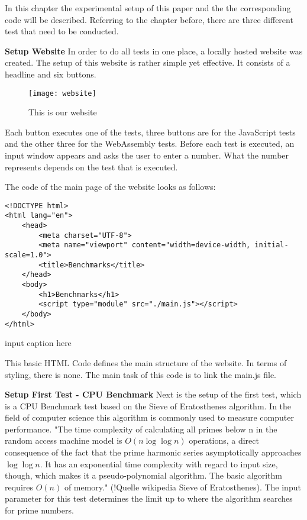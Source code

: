 In this chapter the experimental setup of this paper and the the corresponding code will be described. Referring to the chapter before, there are three different test that need to be conducted. 

\textbf{Setup Website} \newline
In order to do all tests in one place, a locally hosted website was created. The setup of this website is rather simple yet effective. It consists of a headline and six buttons.
\begin{figure}[H]
    \centering
    \caption[]{This is our website}
	\label{fig:website}
    \texttt{[image: website]}
\end{figure}

Each button executes one of the tests, three buttons are for the JavaScript tests and the other three for the WebAssembly tests. Before each test is executed, an input window appears and asks the user to enter a number. What the number represents depends on the test that is executed.

The code of the main page of the website looks as follows:
\begin{verbatim}
<!DOCTYPE html>
<html lang="en">
    <head>
        <meta charset="UTF-8">
        <meta name="viewport" content="width=device-width, initial-scale=1.0">
        <title>Benchmarks</title>
    </head>
    <body>
        <h1>Benchmarks</h1>
        <script type="module" src="./main.js"></script>
    </body>
</html>
\end{verbatim}
input caption here

This basic HTML Code defines the main structure of the website. In terms of styling, there is none. The main task of this code is to link the main.js file.  

\textbf{Setup First Test - CPU Benchmark} \newline
Next is the setup of the first test, which is a CPU Benchmark test based on the Sieve of Eratosthenes algorithm. In the field of computer science this algorithm is commonly used to measure computer performance. "The time complexity of calculating all primes below n in the random access machine model is \( O(n \log \log n) \) operations, a direct consequence of the fact that the prime harmonic series asymptotically approaches \( \log \log n\). It has an exponential time complexity with regard to input size, though, which makes it a pseudo-polynomial algorithm. The basic algorithm requires \( O(n) \) of memory." (!Quelle wikipedia Sieve of Eratosthenes).
The input parameter for this test determines the limit up to where the algorithm searches for prime numbers.

